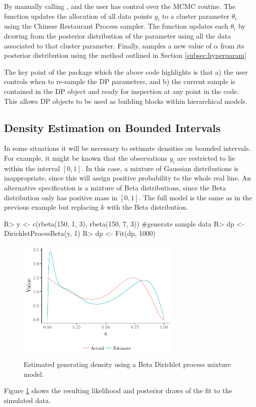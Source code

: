 \documentclass[nojss]{jss}
\begin{document}
By manually calling ,  and  the user has control over the MCMC routine. The function  updates the allocation of all data points $y_i$ to a cluster parameter $\theta _i$ using the Chinese Restaurant Process sampler. The function  updates each $\theta _i$ by drawing from the posterior distribution of the parameter using all the data associated to that cluster parameter. Finally,  samples a new value of $\alpha$ from its posterior distribution using the method outlined in Section \ref{subsec:hyperparam}

The key point of the   package which the above code highlights is that a) the user controls when to re-sample the DP parameters, and b) the current sample is contained in the DP object and ready for inspection at any point in the code. This allows DP objects to be used as building blocks within hierarchical models.



\subsection{Density Estimation on Bounded Intervals}
In some situations it will be necessary to estimate densities on bounded intervals. For example, it might be known that the observations $y_i$ are restricted to lie within the interval $[0,1]$. In this case, a mixture of Gaussian distributions is inappropriate, since this will assign positive probability to the whole real line. An alternative specification is a mixture of Beta distributions, since the Beta distribution only has positive mass in $[0,1]$. The full model is the same as in the previous example but replacing $k$ with the Beta distribution.

\begin{Schunk}
\begin{Sinput}
R> y <- c(rbeta(150, 1, 3), rbeta(150, 7, 3)) #generate sample data
R> dp <- DirichletProcesBeta(y, 1)
R> dp <- Fit(dp, 1000)
\end{Sinput}
\end{Schunk}

\begin{figure}[tb]
	\centering
	\includegraphics[height=60mm, width=80mm]{img/density_bounded_plot.pdf}
	\caption{Estimated generating density using a Beta Dirichlet process mixture model.}
	\label{fig:densitybounded}
\end{figure}
Figure \ref{fig:densitybounded} shows the resulting likelihood and posterior draws of the fit to the simulated data.
\end{document}
